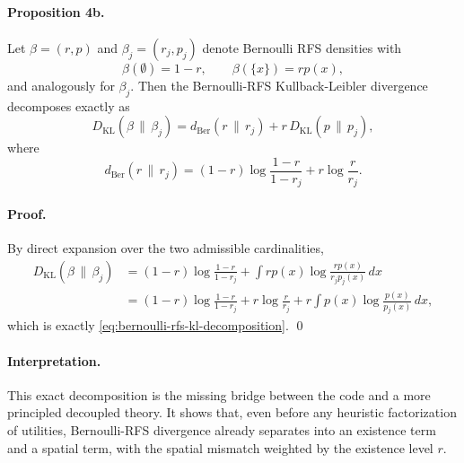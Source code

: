 \paragraph{Proposition 4b.}
Let $\beta=(r,p)$ and $\beta_j=(r_j,p_j)$ denote Bernoulli RFS densities with
\begin{equation}
\beta(\emptyset)=1-r,
\qquad
\beta(\{x\}) = r p(x),
\end{equation}
and analogously for $\beta_j$. Then the Bernoulli-RFS Kullback-Leibler divergence decomposes exactly as
\begin{equation}
D_{\mathrm{KL}}(\beta \,\|\, \beta_j)
=
d_{\mathrm{Ber}}(r\,\|\,r_j)
+
r\,D_{\mathrm{KL}}(p\,\|\,p_j),
\label{eq:bernoulli-rfs-kl-decomposition}
\end{equation}
where
\begin{equation}
d_{\mathrm{Ber}}(r\,\|\,r_j)
=
(1-r)\log\frac{1-r}{1-r_j}
+
r\log\frac{r}{r_j}.
\end{equation}

\paragraph{Proof.}
By direct expansion over the two admissible cardinalities,
\begin{align}
D_{\mathrm{KL}}(\beta \,\|\, \beta_j)
&=
(1-r)\log\frac{1-r}{1-r_j}
+
\int r p(x)\log \frac{r p(x)}{r_j p_j(x)}\,dx
\\
&=
(1-r)\log\frac{1-r}{1-r_j}
+
r\log\frac{r}{r_j}
+
r\int p(x)\log\frac{p(x)}{p_j(x)}\,dx,
\end{align}
which is exactly \eqref{eq:bernoulli-rfs-kl-decomposition}. \qed

\paragraph{Interpretation.}
This exact decomposition is the missing bridge between the code and a more principled decoupled theory. It shows that, even before any heuristic factorization of utilities, Bernoulli-RFS divergence already separates into an existence term and a spatial term, with the spatial mismatch weighted by the existence level $r$.


